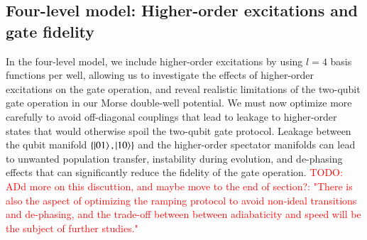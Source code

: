 \documentclass{subfiles}
\begin{document}
\subsection{Four-level model: Higher-order excitations and gate fidelity}
In the four-level model, we include higher-order excitations by using $l=4$ basis functions per well, allowing us to investigate the effects of higher-order excitations on the gate operation, and reveal realistic limitations of the two-qubit gate operation in our Morse double-well potential. We must now optimize more carefully to avoid off-diagonal couplings that lead to leakage to higher-order states that would otherwise spoil the two-qubit gate protocol. Leakage between the qubit manifold $\{\ket{01}, \ket{10}\}$ and the higher-order spectator manifolds can lead to unwanted population transfer, instability during evolution, and de-phasing effects that can significantly reduce the fidelity of the gate operation. \textcolor{red}{TODO: ADd more on this discuttion, and maybe move to the end of section?: "There is also the aspect of optimizing the ramping protocol to avoid non-ideal transitions and de-phasing, and the trade-off between between adiabaticity and speed will be the subject of further studies." }
\end{document}
